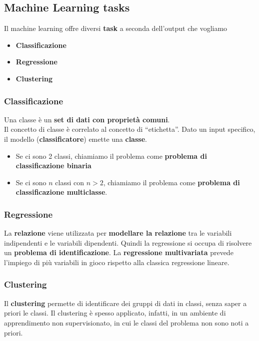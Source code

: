 \subsection{Machine Learning tasks}
Il machine learning offre diversi \textbf{task} a seconda dell'output
%
che vogliamo
\begin{itemize}
    \item \textbf{Classificazione}
    \item \textbf{Regressione}
    \item \textbf{Clustering}
\end{itemize}
\subsubsection{Classificazione}
{
    Una classe è un \textbf{set di dati con proprietà comuni}.
\\ 
    Il concetto di classe è correlato al concetto di ``etichetta''.
}
{
    Dato un input specifico, il modello (\textbf{classificatore})
%
    emette una \textbf{classe}.
}
\begin{itemize}
    \item Se ci sono 2 classi, chiamiamo il problema come 
%    
    \textbf{problema di classificazione binaria}
    \item Se ci sono \( n \) classi con \( n > 2\), chiamiamo il 
%
    problema come \textbf{problema di classificazione multiclasse}.
\end{itemize}
\subsubsection{Regressione}
{
    La \textbf{relazione} viene utilizzata per \textbf{modellare la 
%    
    relazione} tra le variabili indipendenti e le variabili dipendenti. 
}
Quindi la regressione si occupa di risolvere un \textbf{problema
%
di identificazione}.
{
    La \textbf{regressione multivariata} prevede l'impiego di più
%
    variabili in gioco rispetto alla classica regressione lineare.
}
\newpage
\subsubsection{Clustering}
{
    Il \textbf{clustering} permette di identificare dei gruppi
%
    di dati in classi, senza saper a priori le classi.
}
Il clustering è spesso applicato, infatti, in un ambiente di 
%
apprendimento non supervisionato, in cui le classi del problema
%
non sono noti a priori.

